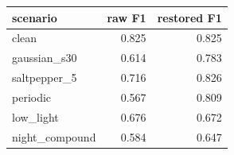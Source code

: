 \begin{tabular}{lrr}
\toprule
scenario & raw F1 & restored F1 \\
\midrule
clean & 0.825 & 0.825 \\
gaussian_s30 & 0.614 & 0.783 \\
saltpepper_5 & 0.716 & 0.826 \\
periodic & 0.567 & 0.809 \\
low_light & 0.676 & 0.672 \\
night_compound & 0.584 & 0.647 \\
\bottomrule
\end{tabular}

